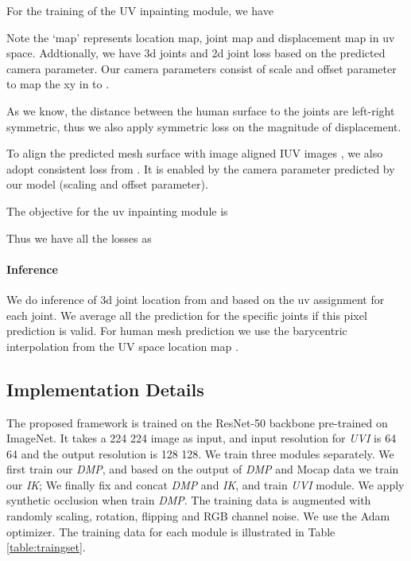 \documentclass[10pt,twocolumn,letterpaper]{article}
\begin{document}
For the training of the UV inpainting module, we have 

Note the `map' represents  location map,  joint map and  displacement map in uv space. Addtionally, we have 3d joints and 2d joint loss based on the predicted camera parameter. Our camera parameters  consist of scale and offset parameter to map the xy in   to .


As we know, the distance between the human surface to the joints are left-right symmetric, thus we also apply symmetric loss on the magnitude of displacement.


To align the predicted mesh surface with image aligned IUV images , we also adopt consistent loss from \cite{decomr}. It is enabled by the camera parameter predicted by our model (scaling and offset parameter). 

The objective for the uv inpainting module is 




Thus we have all the losses as 



\paragraph{Inference} We do inference of 3d joint location from   and based on the uv assignment  for each joint. We average all the prediction for the specific joints if this pixel prediction is valid. For human mesh prediction we use the barycentric interpolation from the UV space location map .



\subsection{Implementation Details}

The proposed framework is trained on the ResNet-50 \cite{resnet} backbone pre-trained on ImageNet. It takes a 224  224 image as input, and input resolution for  \textit{UVI}  is 64  64 and the output resolution is 128  128. 
We train three modules separately. We first train our \textit{DMP}, and based on the output of  \textit{DMP} and Mocap data we train our \textit{IK}; We finally fix and concat \textit{DMP} and \textit{IK}, and train \textit{UVI} module. We apply synthetic occlusion \cite{SyntheticOcclusion} when train \textit{DMP}. The training data is augmented with randomly scaling, rotation, flipping and RGB channel noise. We use the Adam optimizer. The training data for each module is illustrated in Table \ref{table:traingset}.
\end{document}
